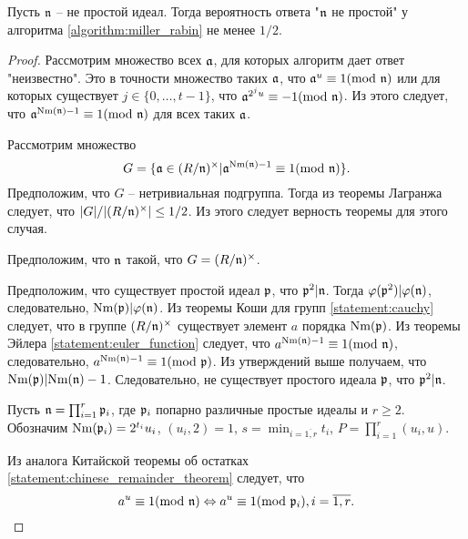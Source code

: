 \documentclass[_dissertation.tex]{subfiles}
\begin{document}
\begin{proposition}
    Пусть $\mathfrak{n}$ -- не простой идеал.
    Тогда вероятность ответа "$\mathfrak{n}$ не простой" у алгоритма \ref{algorithm:miller_rabin} не менее $1/2$.
\end{proposition}
\begin{proof}
    Рассмотрим множество всех $\mathfrak{a}$, для которых алгоритм дает ответ "неизвестно".
    Это в точности множество таких $\mathfrak{a}$, что $\mathfrak{a}^u \equiv 1(\textrm{mod } \mathfrak{n})$ или для которых существует $j \in \{0, \dots, t-1\}$, что $\mathfrak{a}^{2^{j}u} \equiv -1(\textrm{mod } \mathfrak{n})$.
    Из этого следует, что $\mathfrak{a}^{\textrm{Nm}(\mathfrak{n}) - 1} \equiv 1(\textrm{mod } \mathfrak{n})$ для всех таких $\mathfrak{a}$.

    Рассмотрим множество
    \begin{equation*}
        G = \{\mathfrak{a} \in (R/\mathfrak{n})^{\times} | \mathfrak{a}^{\textrm{Nm}(\mathfrak{n}) - 1} \equiv 1(\textrm{mod } \mathfrak{n})\}.
    \end{equation*}
    Предположим, что $G$ -- нетривиальная подгруппа.
    Тогда из теоремы Лагранжа следует, что $|G| / |(R/\mathfrak{n})^{\times}| \le 1/2$.
    Из этого следует верность теоремы для этого случая.

    Предположим, что $\mathfrak{n}$ такой, что $G = (R/\mathfrak{n})^{\times}$.

    Предположим, что существует простой идеал $\mathfrak{p}$, что $\mathfrak{p}^2 | \mathfrak{n}$.
    Тогда $\varphi(\mathfrak{p}^2) | \varphi(\mathfrak{n})$, следовательно, $\textrm{Nm}(\mathfrak{p}) | \varphi(\mathfrak{n})$.
    Из теоремы Коши для групп \ref{statement:cauchy} следует, что в группе $(R/\mathfrak{n})^{\times}$ существует элемент $a$ порядка $\textrm{Nm}(\mathfrak{p})$.
    Из теоремы Эйлера \ref{statement:euler_function} следует, что $a^{\textrm{Nm}(\mathfrak{n}) - 1} \equiv 1(\textrm{mod } \mathfrak{n})$, следовательно, $a^{\textrm{Nm}(\mathfrak{n}) - 1} \equiv 1(\textrm{mod } \mathfrak{p})$.
    Из утверждений выше получаем, что $\textrm{Nm}(\mathfrak{p}) | \textrm{Nm}(\mathfrak{n}) - 1$.
    Следовательно, не существует простого идеала $\mathfrak{p}$, что $\mathfrak{p}^2 | \mathfrak{n}$.

    Пусть $\mathfrak{n} = \prod_{i=1}^r \mathfrak{p}_i$, где $\mathfrak{p}_i$ попарно различные простые идеалы и $r \ge 2$.
    Обозначим $\textrm{Nm}(\mathfrak{p}_i) = 2^{t_i} u_i$, $(u_i, 2) = 1$, $s = \min_{i=\overline{1, r}} t_i$, $P = \prod_{i=1}^r (u_i, u)$.

    Из аналога Китайской теоремы об остатках \ref{statement:chinese_remainder_theorem} следует, что
    \begin{equation*}
        a^u \equiv 1(\textrm{mod } \mathfrak{n})
        \Leftrightarrow
        a^u \equiv 1(\textrm{mod } \mathfrak{p}_i), i=\overline{1, r}.
    \end{equation*}


\end{proof}
\end{document}

